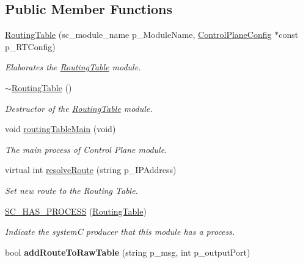 \subsection*{Public Member Functions}
\begin{DoxyCompactItemize}
\item 
\hypertarget{classRoutingTable_a71a78835bd82f883251e5937cd3d9bcc}{\hyperlink{classRoutingTable_a71a78835bd82f883251e5937cd3d9bcc}{Routing\-Table} (sc\-\_\-module\-\_\-name p\-\_\-\-Module\-Name, \hyperlink{classControlPlaneConfig}{Control\-Plane\-Config} $\ast$const p\-\_\-\-R\-T\-Config)}\label{classRoutingTable_a71a78835bd82f883251e5937cd3d9bcc}

\begin{DoxyCompactList}\small\item\em Elaborates the \hyperlink{classRoutingTable}{Routing\-Table} module. \end{DoxyCompactList}\item 
\hyperlink{classRoutingTable_abe5b508511742899600b98401af7c761}{$\sim$\-Routing\-Table} ()
\begin{DoxyCompactList}\small\item\em Destructor of the \hyperlink{classRoutingTable}{Routing\-Table} module. \end{DoxyCompactList}\item 
void \hyperlink{classRoutingTable_a9cde93247eb0ec479d085c427e8c040d}{routing\-Table\-Main} (void)
\begin{DoxyCompactList}\small\item\em The main process of Control Plane module. \end{DoxyCompactList}\item 
\hypertarget{classRoutingTable_a15cac9bbc532546c14ce29d5b19772bc}{virtual int \hyperlink{classRoutingTable_a15cac9bbc532546c14ce29d5b19772bc}{resolve\-Route} (string p\-\_\-\-I\-P\-Address)}\label{classRoutingTable_a15cac9bbc532546c14ce29d5b19772bc}

\begin{DoxyCompactList}\small\item\em Set new route to the Routing Table. \end{DoxyCompactList}\item 
\hyperlink{classRoutingTable_a6672fa1eeba99406384473815b27b6ea}{S\-C\-\_\-\-H\-A\-S\-\_\-\-P\-R\-O\-C\-E\-S\-S} (\hyperlink{classRoutingTable}{Routing\-Table})
\begin{DoxyCompactList}\small\item\em Indicate the system\-C producer that this module has a process. \end{DoxyCompactList}\item 
\hypertarget{classRoutingTable_a2d64d4f1e7d3a8cbb209633c1f50cae2}{bool {\bfseries add\-Route\-To\-Raw\-Table} (string p\-\_\-msg, int p\-\_\-output\-Port)}\label{classRoutingTable_a2d64d4f1e7d3a8cbb209633c1f50cae2}


\end{DoxyCompactItemize}
